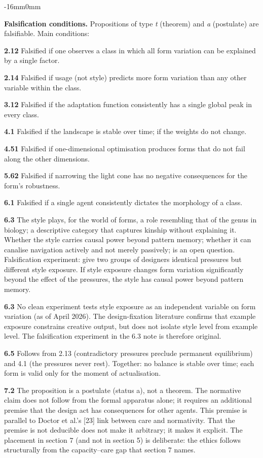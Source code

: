 \documentclass[10pt,oneside]{book}
\newenvironment{widebody}{%
  \begin{adjustwidth}{-16mm}{0mm}%
}{%
  \end{adjustwidth}%
}
\begin{document}
\begin{widebody}
{\bigskip
\textbf{Falsification conditions.} Propositions of type \textit{t} (theorem) and \textit{a} (postulate) are falsifiable. Main conditions:

\textbf{2.12} Falsified if one observes a class in which all form variation can be explained by a single factor.

\textbf{2.14} Falsified if usage (not style) predicts more form variation than any other variable within the class.

\textbf{3.12} Falsified if the adaptation function consistently has a single global peak in every class.

\textbf{4.1} Falsified if the landscape is stable over time; if the weights do not change.

\textbf{4.51} Falsified if one-dimensional optimisation produces forms that do not fail along the other dimensions.

\textbf{5.62} Falsified if narrowing the light cone has no negative consequences for the form's robustness.

\textbf{6.1} Falsified if a single agent consistently dictates the morphology of a class.

\textbf{6.3} The style plays, for the world of forms, a role resembling that of the genus in biology; a descriptive category that captures kinship without explaining it. Whether the style carries causal power beyond pattern memory; whether it can canalise navigation actively and not merely passively; is an open question. Falsification experiment: give two groups of designers identical pressures but different style exposure. If style exposure changes form variation significantly beyond the effect of the pressures, the style has causal power beyond pattern memory.

\textbf{6.3} No clean experiment tests style exposure as an independent variable on form variation (as of April 2026). The design-fixation literature confirms that example exposure constrains creative output, but does not isolate style level from example level. The falsification experiment in the 6.3 note is therefore original.

\textbf{6.5} Follows from 2.13 (contradictory pressures preclude permanent equilibrium) and 4.1 (the pressures never rest). Together: no balance is stable over time; each form is valid only for the moment of actualisation.

\textbf{7.2} The proposition is a postulate (status a), not a theorem. The normative claim does not follow from the formal apparatus alone; it requires an additional premise that the design act has consequences for other agents. This premise is parallel to Doctor et al.'s [23] link between care and normativity. That the premise is not deducible does not make it arbitrary; it makes it explicit. The placement in section 7 (and not in section 5) is deliberate: the ethics follows structurally from the capacity--care gap that section 7 names.

}
\end{widebody}
\end{document}
